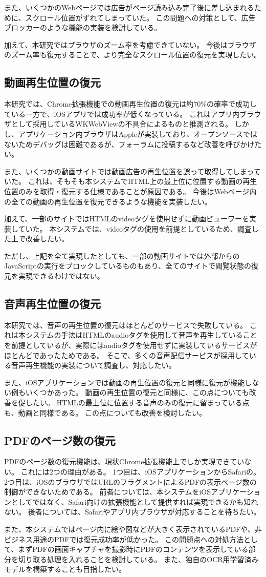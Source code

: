 また、いくつかのWebページでは広告がページ読み込み完了後に差し込まれるために、スクロール位置がずれてしまっていた。
この問題への対策として、広告ブロッカーのような機能の実装を検討している。

加えて、本研究ではブラウザのズーム率を考慮できていない。
今後はブラウザのズーム率も復元することで、より完全なスクロール位置の復元を実現したい。

\subsection{動画再生位置の復元}
本研究では、Chrome拡張機能での動画再生位置の復元は約70\%の確率で成功している一方で、iOSアプリでは成功率が低くなっている。
これはアプリ内ブラウザとして採用しているWKWebViewの不具合によるものと推測される。
しかし、アプリケーション内ブラウザはAppleが実装しており、オープンソースではないためデバッグは困難であるが、フォーラムに投稿するなど改善を呼びかけたい。

また、いくつかの動画サイトでは動画広告の再生位置を誤って取得してしまっていた。
これは、そもそも本システムでHTML上の最上位に位置する動画の再生位置のみを取得・復元する仕様であることが原因である。
今後はWebページ内の全ての動画の再生位置を復元できるような機能を実装したい。

加えて、一部のサイトではHTMLのvideoタグを使用せずに動画ビューワーを実装していた。
本システムでは、videoタグの使用を前提としているため、調査した上で改善したい。

ただし、上記を全て実現したとしても、一部の動画サイトでは外部からのJavaScriptの実行をブロックしているものもあり、全てのサイトで閲覧状態の復元を実現できるわけではない。

\subsection{音声再生位置の復元}
本研究では、音声の再生位置の復元はほとんどのサービスで失敗している。
これは本システムの手法はHTMLのaudioタグを使用して音声を再生していることを前提としているが、実際にはaudioタグを使用せずに実装しているサービスがほとんどであったためである。
そこで、多くの音声配信サービスが採用している音声再生機能の実装について調査し、対応したい。

また、iOSアプリケーションでは動画の再生位置の復元と同様に復元が機能しない例もいくつかあった。
動画の再生位置の復元と同様に、この点についても改善を促したい。
HTMLの最上位に位置する音声のみの復元に留まっている点も、動画と同様である。
この点についても改善を検討したい。

\subsection{PDFのページ数の復元}
PDFのページ数の復元機能は、現状Chrome拡張機能上でしか実現できていない。
これには2つの理由がある。
1つ目は、iOSアプリケーションからSafariの。
2つ目は、iOSのブラウザではURLのフラグメントによるPDFの表示ページ数の制御ができないためである。
前者については、本システムをiOSアプリケーションとしてではなく、Safari向けの拡張機能として提供すれば実現できるかも知れない。
後者については、Safariやアプリ内ブラウザが対応することを待ちたい。

また、本システムではページ内に絵や図などが大きく表示されているPDFや、非ビジネス用途のPDFでは復元成功率が低かった。
この問題点への対処方法として、まずPDFの画面キャプチャを撮影時にPDFのコンテンツを表示している部分を切り取る処理を入れることを検討している。
また、独自のOCR用学習済みモデルを構築することも目指したい。